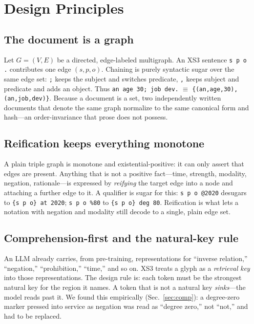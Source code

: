 \documentclass[conference]{IEEEtran}
\newcommand{\code}[1]{\texttt{#1}}
\begin{document}
\section{Design Principles}\label{sec:design}

\subsection{The document is a graph}
Let $G=(V,E)$ be a directed, edge-labeled multigraph. An XS3 sentence
\code{s p o .} contributes one edge $(s,p,o)$. Chaining is purely syntactic
sugar over the same edge set: \code{;} keeps the subject and switches predicate,
\code{,} keeps subject and predicate and adds an object. Thus
\code{an age 30; job dev.} $\equiv$ \code{\{(an,age,30),(an,job,dev)\}}.
Because a document is a set, two independently written documents that denote the
same graph normalize to the same canonical form and hash---an order-invariance
that prose does not possess.

\subsection{Reification keeps everything monotone}
A plain triple graph is monotone and existential-positive: it can only assert
that edges are present. Anything that is not a positive fact---time, strength,
modality, negation, rationale---is expressed by \emph{reifying} the target edge
into a node and attaching a further edge to it. A qualifier is sugar for this:
\code{s p o @2020} desugars to \code{\{s p o\} at 2020}; \code{s p o \%80} to
\code{\{s p o\} deg 80}. Reification is what lets a notation with negation and
modality still decode to a single, plain edge set.

\subsection{Comprehension-first and the natural-key rule}\label{sec:key}
An LLM already carries, from pre-training, representations for ``inverse
relation,'' ``negation,'' ``prohibition,'' ``time,'' and so on. XS3 treats a
glyph as a \emph{retrieval key} into those representations. The design rule is:
each token must be the strongest natural key for the region it names. A token
that is not a natural key \emph{sinks}---the model reads past it. We found this
empirically (Sec.~\ref{sec:comp}): a degree-zero marker pressed into service as
negation was read as ``degree zero,'' not ``not,'' and had to be replaced.
\end{document}
